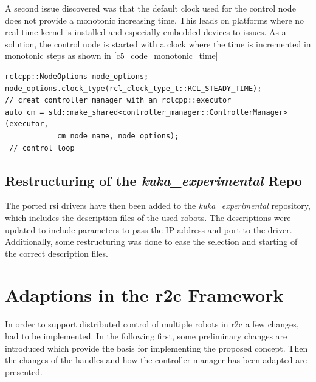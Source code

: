 A second issue discovered was that the default clock used for the control node does not provide a monotonic increasing time. This leads on platforms where no real-time kernel is installed and especially embedded devices to issues. As a solution, the control node is started with a clock where the time is incremented in monotonic steps as shown in \autoref{c5_code_monotonic_time}
\lstset{language=C++,basicstyle=\small}
\begin{lstlisting}[caption=Small code extract for setting monotonic clock.,label=c5_code_monotonic_time]
rclcpp::NodeOptions node_options;
node_options.clock_type(rcl_clock_type_t::RCL_STEADY_TIME);
// creat controller manager with an rclcpp::executor
auto cm = std::make_shared<controller_manager::ControllerManager>(executor,
            cm_node_name, node_options);
 // control loop
\end{lstlisting}

\subsection{Restructuring of the \textit{kuka\_experimental} Repo}
The ported \gls{rsi} drivers have then been added to the \textit{kuka\_experimental} repository, which includes the description files of the used robots. The descriptions were updated to include parameters to pass the IP address and port to the driver. Additionally, some restructuring was done to ease the selection and starting of the correct description files. 

\section{Adaptions in the \gls{r2c} Framework}
In order to support distributed control of multiple robots in \gls{r2c} a few changes, had to be implemented. In the following first, some preliminary changes are introduced which provide the basis for implementing the proposed concept. Then the changes of the \glspl{handle} and how the controller manager has been adapted are presented.

